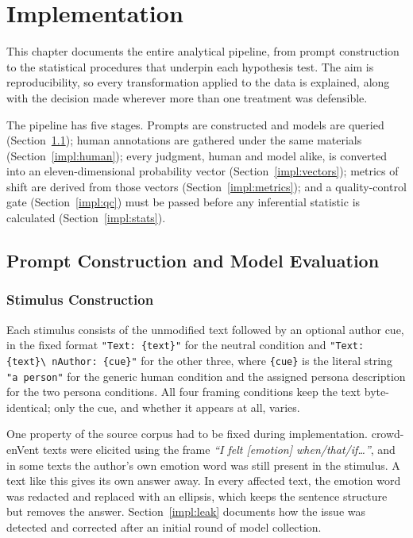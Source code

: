 \chapter{Implementation}
\label{c:implementation}

\noindent
This chapter documents the entire analytical pipeline, from prompt construction to the statistical
procedures that underpin each hypothesis test. The aim is reproducibility, so every
transformation applied to the data is explained, along with the decision made wherever more than
one treatment was defensible.

The pipeline has five stages. Prompts are constructed and models are queried
(Section~\ref{impl:prompts}); human annotations are gathered under the same materials
(Section~\ref{impl:human}); every judgment, human and model alike, is converted into an
eleven-dimensional probability vector (Section~\ref{impl:vectors}); metrics of shift are derived
from those vectors (Section~\ref{impl:metrics}); and a quality-control gate
(Section~\ref{impl:qc}) must be passed before any inferential statistic is calculated
(Section~\ref{impl:stats}).

\section{Prompt Construction and Model Evaluation}
\label{impl:prompts}

\subsection{Stimulus Construction}
\label{impl:stimulus}

\noindent
Each stimulus consists of the unmodified text followed by an optional author cue, in the fixed
format \texttt{"Text: \{text\}"} for the neutral condition and \texttt{"Text: \{text\}\textbackslash
nAuthor: \{cue\}"} for the other three, where \texttt{\{cue\}} is the literal string
\texttt{"a person"} for the generic human condition and the assigned persona description for the
two persona conditions. All four framing conditions keep the text byte-identical; only the cue,
and whether it appears at all, varies.

One property of the source corpus had to be fixed during implementation. crowd-enVent texts were
elicited using the frame \emph{``I felt [emotion] when\slash that\slash if\ldots''}, and in some
texts the author's own emotion word was still present in the stimulus. A text like this gives its
own answer away. In every affected text, the emotion word was redacted and replaced with an
ellipsis, which keeps the sentence structure but removes the answer. Section~\ref{impl:leak}
documents how the issue was detected and corrected after an initial round of model collection.

